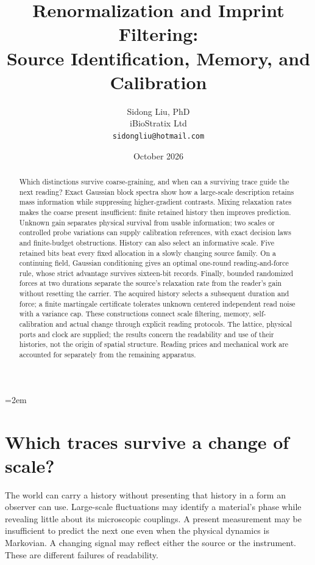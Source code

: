 \documentclass[12pt,a4paper]{article}
\title{Renormalization and Imprint Filtering:\\
Source Identification, Memory, and Calibration}
\author{Sidong Liu, PhD\\iBioStratix Ltd\\
\texttt{sidongliu@hotmail.com}}
\date{October 2026}
\begin{document}
\emergencystretch=2em
\raggedbottom
\maketitle

\begin{abstract}
Which distinctions survive coarse-graining, and when can a surviving
trace guide the next reading? Exact Gaussian block spectra show how a
large-scale description retains mass information while suppressing
higher-gradient contrasts. Mixing relaxation rates makes the coarse
present insufficient: finite retained history then improves prediction.
Unknown gain separates physical survival from usable information; two
scales or controlled probe variations can supply calibration references,
with exact decision laws and finite-budget obstructions.
History can also select an informative scale. Five retained bits beat
every fixed allocation in a slowly changing source family. On a
continuing field, Gaussian conditioning gives an optimal one-round
reading-and-force rule, whose strict advantage survives sixteen-bit
records. Finally, bounded randomized forces at two durations separate
the source's relaxation rate from the reader's gain without resetting
the carrier. The acquired history selects a subsequent duration and
force; a finite martingale certificate tolerates unknown centered
independent read noise with a variance cap.
These constructions connect scale filtering, memory, self-calibration
and actual change through explicit reading protocols. The lattice,
physical ports and clock are supplied; the results concern the
readability and use of their histories, not the origin of spatial
structure. Reading prices and mechanical work are accounted for
separately from the remaining apparatus.
\end{abstract}

\section{Which traces survive a change of scale?}

The world can carry a history without presenting that history in a form
an observer can use. Large-scale fluctuations may identify a material's
phase while revealing little about its microscopic couplings. A present
measurement may be insufficient to predict the next one even when the
physical dynamics is Markovian. A changing signal may reflect either
the source or the instrument. These are different failures of
readability.
\end{document}
